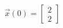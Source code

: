 \documentclass[preview]{standalone}
\begin{document}
\begin{align*}
\vec{x}(0) = \begin{bmatrix} 2 \\ 2 \end{bmatrix}
\end{align*}
\end{document}
